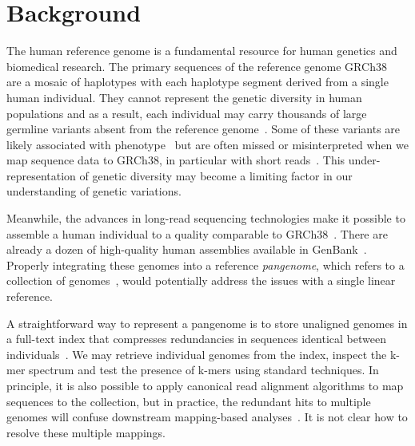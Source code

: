 \documentclass[twocolumn]{bmcart}%
\begin{document}
\section*{Background}

The human reference genome is a fundamental resource for human genetics and
biomedical research. The primary sequences of the reference genome
GRCh38~\cite{Schneider:2017aa} are a mosaic of haplotypes with each haplotype segment derived
from a single human individual. They cannot represent the genetic diversity in
human populations and as a result, each individual may carry thousands of large
germline variants absent from the reference genome~\cite{Huddleston:2017aa}.
Some of these variants are likely associated with phenotype~\cite{Eichler_2010}
but are often missed or misinterpreted when we map sequence data to GRCh38, in
particular with short reads~\cite{Li:2018aa}. This under-representation of
genetic diversity may become a limiting factor in our understanding of genetic
variations.

Meanwhile, the advances in long-read sequencing technologies make it possible
to assemble a human individual to a quality comparable to
GRCh38~\cite{Schneider:2017aa,Wenger_2019}. There are already a dozen of
high-quality human assemblies available in GenBank~\cite{Audano:2019aa}.
Properly integrating these genomes into a reference \emph{pangenome}, which
refers to a collection of genomes~\cite{cpgc:2016aa}, would potentially address
the issues with a single linear reference.

A straightforward way to represent a pangenome is to store unaligned genomes
in a full-text index that compresses redundancies in sequences identical
between individuals~\cite{Makinen:2010aa,Liu_2016,Boucher_2019}. We may
retrieve individual genomes from the index, inspect the k-mer spectrum and test
the presence of k-mers using standard techniques. In principle, it is also
possible to apply canonical read alignment algorithms to map sequences to
the collection, but in practice, the redundant hits to multiple genomes will
confuse downstream mapping-based analyses~\cite{NA2016159}. It is not clear how
to resolve these multiple mappings.
\end{document}
